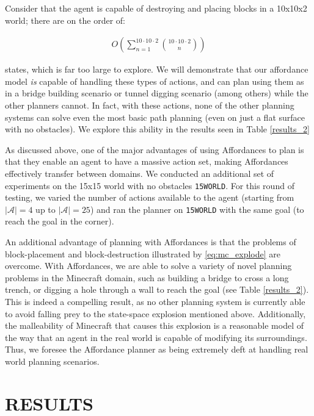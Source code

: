 \documentclass[]{article}
\begin{document}
Consider that the agent is capable of destroying and placing blocks 
in a 10x10x2 world; there are on the order of:

\begin{align}
O\left(\sum_{n=1}^{10 \cdot 10 \cdot 2} \binom{10 \cdot 10 \cdot 2}{n}\right)
\label{eq:mc_explode}
\end{align}

states, which is far too large to explore. We will demonstrate that our 
affordance model {\it is} capable of handling these types of actions, 
and can plan using them as in a bridge building scenario or tunnel 
digging scenario (among others) while the other planners cannot. 
In fact, with these actions, none of the other planning systems 
can solve even the most basic path planning (even on just a flat 
surface with no obstacles). We explore this ability in the results 
seen in Table \ref{results_2}

As discussed above, one of the major advantages of using Affordances 
to plan is that they enable an agent to have a massive action set, 
making Affordances effectively transfer between domains. We 
conducted an additional set of experiments on the 15x15 world 
with no obstacles \texttt{15WORLD}. For this round of testing, we 
varied the number of actions available to the agent (starting from 
$|\mathcal{A}| = 4$ up to $|\mathcal{A}| = 25$) and ran the planner 
on \texttt{15WORLD} with the same goal (to reach the goal in the corner).


An additional advantage of planning with Affordances is that the 
problems of block-placement and block-destruction illustrated by 
\ref{eq:mc_explode} are overcome. With Affordances, we are able 
to solve a variety of novel planning problems in the Minecraft 
domain, such as building a bridge to cross a long trench, or digging 
a hole through a wall to reach the goal (see Table \ref{results_2}). 
This is indeed a compelling result, as no other planning system is 
currently able to avoid falling prey to the state-space explosion 
mentioned above. Additionally, the malleability of Minecraft that 
causes this explosion is a reasonable model of the way that an 
agent in the real world is capable of modifying its surroundings. 
Thus, we foresee the Affordance planner as being extremely deft 
at handling real world planning scenarios.

\section{RESULTS}
\end{document}
